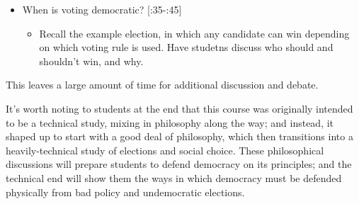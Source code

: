 \begin{itemize}
    \item When is voting democratic? [:35-:45]
    \begin{itemize}
%
%
%
%

        \item Recall the example election, in which any candidate can win depending on which voting rule is used.  Have studetns discuss who should and shouldn't win, and why.

    \end{itemize}

\end{itemize}

This leaves a large amount of time for additional discussion and debate.

It's worth noting to students at the end that this course was originally intended to be a technical study, mixing in philosophy along the way; and instead, it shaped up to start with a good deal of philosophy, which then transitions into a heavily-technical study of elections and social choice.  These philosophical discussions will prepare students to defend democracy on its principles; and the technical end will show them the ways in which democracy must be defended physically from bad policy and undemocratic elections.

